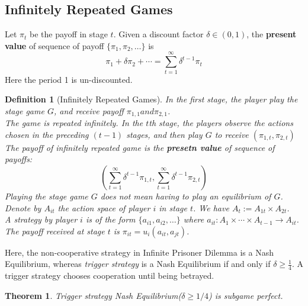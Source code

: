 \documentclass[12pt]{article}
\newtheorem{definition}{Definition}[section]
\newtheorem{theorem}{Theorem}[section]
\theoremstyle{definition}
\begin{document}
\subsection{Infinitely Repeated Games}
Let $\pi_t$ be the payoff in stage $t$. Given a discount factor $\delta\in (0,1)$, the \textbf{present value} of sequence of payoff $\{\pi_1,\pi_2,\ldots\}$ is
\[
\pi_1+\delta\pi_2+\cdots = \sum_{t=1}^\infty \delta^{t-1} \pi_t
\]
Here the period 1 is un-discounted.
\begin{definition}[Infinitely Repeated Games]
\normalfont In the first stage, the player play the stage game $G$, and receive payoff $\pi_{1,1} and \pi_{2,1}$.\\
The game is repeated infinitely. In the $t$th stage, the players observe the actions chosen in the preceding $(t-1)$ stages, and then play $G$ to receive $(\pi_{1,t}, \pi_{2,t})$\\
The payoff of infinitely repeated game is the \textbf{presetn value} of sequence of payoffs:
\[
(\sum_{t=1}^\infty \delta^{t-1}\pi_{1,t}, \sum_{t=1}^\infty \delta^{t-1}\pi_{2,t})
\]
Playing the stage game $G$ does not mean having to play an equilibrium of $G$.\\
Denote by $A_{it}$ the action space of player $i$ in stage $t$. We have $A_t:=A_{1t}\times A_{2t}$.\\
A strategy by player $i$ is of the form $\{a_{i1}, a_{i2},\ldots\}$ where $a_{it}:A_1\times\cdots\times A_{t-1}\to A_{it}$.\\
The payoff received at stage $t$ is $\pi_{it}=u_i(a_{it}, a_{jt})$.
\end{definition}
Here, the non-cooperative strategy in Infinite Prisoner Dilemma is a Nash Equilibrium, whereas \textit{trigger strategy} is a Nash Equilibrium if and only if $\delta\geq \frac{1}{4}$. A trigger strategy chooses cooperation until being betrayed.
\begin{theorem}\normalfont Trigger strategy Nash Equilibrium($\delta\geq 1/4$) is subgame perfect.\end{theorem}
\end{document}
